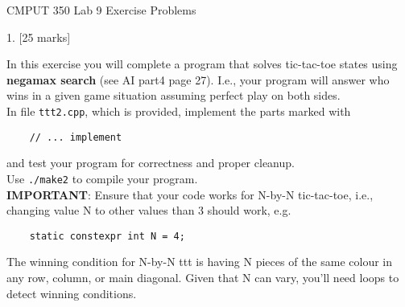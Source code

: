 \documentclass[a4paper,11pt]{article}
\begin{document}

\begin{center}
{\Large CMPUT 350 Lab 9 Exercise Problems}
\end{center}



1. [25 marks]

In this exercise you will complete a program that solves tic-tac-toe states
using \textbf{negamax search} (see AI part4 page 27). I.e., your program will answer
who wins in a given game situation assuming perfect play on both sides.\\

In file \texttt{ttt2.cpp}, which is provided, implement the parts marked with
{\small
\begin{verbatim}
    // ... implement
\end{verbatim}
}
and test your program for correctness and proper cleanup.\\

Use \texttt{./make2} to compile your program. \\

\textbf{IMPORTANT}:
Ensure that your code works for N-by-N tic-tac-toe, i.e., changing value N to
other values than 3 should work, e.g.
{\small
\begin{verbatim}
    static constexpr int N = 4;
\end{verbatim}
}

The winning condition for N-by-N ttt is having N pieces of the same colour in
any row, column, or main diagonal. Given that N can vary, you'll need loops to
detect winning conditions.
\end{document}
